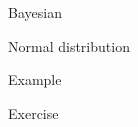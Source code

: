 \documentclass[11pt,titlepage,fleqn]{article}
\begin{document}
\begin{section}{Bayesian}

\end{section}

\begin{section}{Normal distribution}

\end{section}

\begin{section}{Example}

\end{section}

\begin{section}{Exercise}

\end{section}



\end{document}
